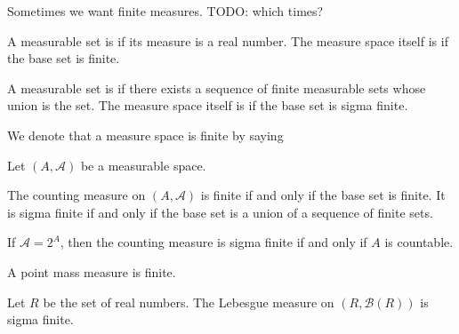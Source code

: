 
\sbasic
















\sstart
{}


Sometimes we want finite measures.
TODO: which times?


A measurable set is
if its measure is a real number.
The measure space itself is
if the base set is finite.

A measurable set is
if there exists a sequence of
finite measurable sets whose
union is the set.
The measure space itself is
if the base set is sigma finite.


We denote that a measure
space is finite by saying

\begin{expl}
Let $(A, \mathcal{A})$ be a measurable space.

The counting measure on $(A, \mathcal{A})$ is
finite if and only if the base set is finite.
It is sigma finite if and only if the base
set is a union of a sequence of finite sets.

If $\mathcal{A} = 2^A$, then the counting
measure is sigma finite if and only if
$A$ is countable.
\end{expl}

\begin{expl}
A point mass measure is finite.
\end{expl}

\begin{expl}
Let $R$ be the set of real numbers.
The Lebesgue measure on
$(R, \mathcal{B}(R))$ is sigma finite.
\end{expl}
\strats
